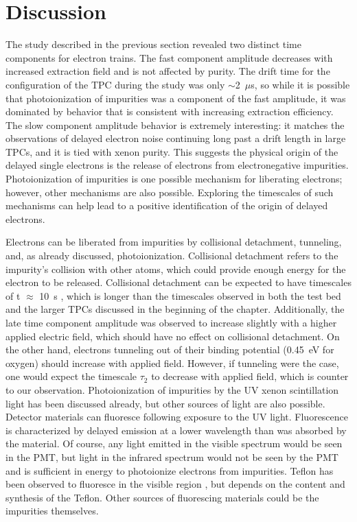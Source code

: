 \section{Discussion}
The study described in the previous section revealed two distinct time components for electron trains. The fast component amplitude decreases with increased extraction field and is not affected by purity. The drift time for the configuration of the \ac{TPC} during the study was only $\sim$2~$\mu$s, so while it is possible that photoionization of impurities was a component of the fast amplitude, it was dominated by behavior that is consistent with increasing extraction efficiency. The slow component amplitude behavior is extremely interesting: it matches the observations of delayed electron noise continuing long past a drift length in large \ac{TPC}s, and it is tied with xenon purity. This suggests the physical origin of the delayed single electrons is the release of electrons from electronegative impurities. Photoionization of impurities is one possible mechanism for liberating electrons; however, other mechanisms are also possible. Exploring the timescales of such mechanisms can help lead to a positive identification of the origin of delayed electrons. 

Electrons can be liberated from impurities by collisional detachment, tunneling, and, as already discussed, photoionization. Collisional detachment refers to the impurity's collision with other atoms, which could provide enough energy for the electron to be released. Collisional detachment can be expected to have timescales of t $\approx$ 10~s \cite{SorensenKamdin2018}, which is longer than the timescales observed in both the test bed and the larger \ac{TPC}s discussed in the beginning of the chapter. Additionally, the late time component amplitude was observed to increase slightly with a higher applied electric field, which should have no effect on collisional detachment. On the other hand, electrons tunneling out of their binding potential (0.45~eV for oxygen) should increase with applied field. However, if tunneling were the case, one would expect the timescale $\tau_{2}$ to decrease with applied field, which is counter to our observation. Photoionization of impurities by the UV xenon scintillation light has been discussed already, but other sources of light are also possible. Detector materials can fluoresce following exposure to the UV light. Fluorescence is characterized by delayed emission at a lower wavelength than was absorbed by the material. Of course, any light emitted in the visible spectrum would be seen in the \ac{PMT}, but light in the infrared spectrum would not be seen by the \ac{PMT} and is sufficient in energy to photoionize electrons from impurities. Teflon has been observed to fluoresce in the visible region \cite{Gachkovskii1969} \cite{Khatipov2011}, but depends on the content and synthesis of the Teflon. Other sources of fluorescing materials could be the impurities themselves. 

